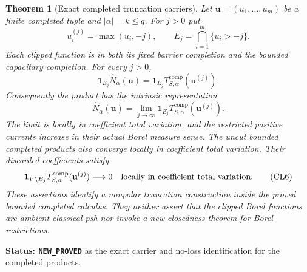 \documentclass[11pt,a4paper]{article}
\numberwithin{equation}{section}
\newtheorem{theorem}{Theorem}[section]
\theoremstyle{definition}
\theoremstyle{remark}
\begin{document}
\begin{theorem}[Exact completed truncation carriers]
\label{thm:r11-completed-truncation-carriers}
Let $\mathbf u=(u_1,\ldots,u_m)$ be a finite completed tuple
and $|\alpha|=k\leq q$. For $j>0$ put
\[
 u_i^{(j)}=\max(u_i,-j),\qquad
 E_j=\bigcap_{i=1}^m\{u_i>-j\}.
 \tag{CL3}
\]
Each clipped function is in both its fixed barrier completion
and the bounded capacitary completion. For every $j>0$,
\[
       \mathbf1_{E_j}\widehat N_\alpha(\mathbf u)
          =\mathbf1_{E_j}
                     T^{\mathrm{comp}}_{S,\alpha}(\mathbf u^{(j)}).
 \tag{CL4}
\]
Consequently the product has the intrinsic representation
\[
       \widehat N_\alpha(\mathbf u)
        =\lim_{j\to\infty}\mathbf1_{E_j}
                     T^{\mathrm{comp}}_{S,\alpha}(\mathbf u^{(j)}).
 \tag{CL5}
\]
The limit is locally in coefficient total variation, and the
restricted positive currents increase in their actual Borel
measure sense. The uncut bounded completed products also
converge locally in coefficient total variation. Their discarded
coefficients satisfy
\[
       \mathbf1_{V\setminus E_j}
                     T^{\mathrm{comp}}_{S,\alpha}(\mathbf u^{(j)})
                         \longrightarrow0
           \quad\hbox{locally in coefficient total variation}.
 \tag{CL6}
\]
These assertions identify a nonpolar truncation construction
inside the proved bounded completed calculus. They neither
assert that the clipped Borel functions are ambient classical
psh nor invoke a new closedness theorem for Borel restrictions.
\end{theorem}

\noindent\textbf{Status: \texttt{NEW\_PROVED}} as the exact
carrier and no-loss identification for the completed products.
\end{document}
